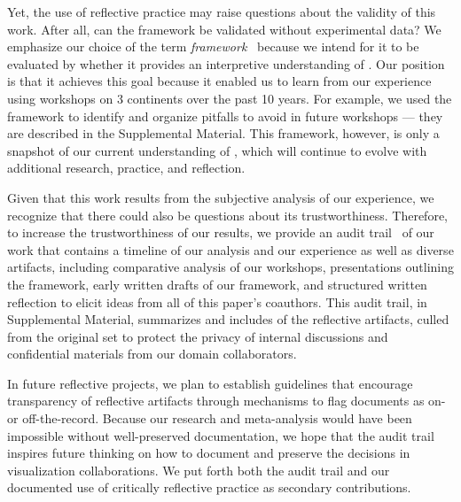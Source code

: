 Yet, the use of reflective practice may raise questions about the validity of this work. After all, can the framework be validated without experimental data? We emphasize our choice of the term {\it framework}~\cite{Jabareen2008} because we intend for it to be evaluated by whether it provides an interpretive understanding of \workshops. Our position is that it achieves this goal because it enabled us to learn from our experience using workshops on 3 continents over the past 10 years. For example, we used the framework to identify and organize \numberOfPitfalls pitfalls to avoid in future workshops --- they are described in the Supplemental Material. This framework, however, is only a snapshot of our current understanding of \workshops, which will continue to evolve with additional research, practice, and reflection.

Given that this work results from the subjective analysis of our experience, we recognize that there could also be questions about its trustworthiness. Therefore, to increase the trustworthiness of our results, we provide an audit trail~\cite{Carcary2009,Lincoln1985} of our work that contains a timeline of our analysis and our experience as well as diverse artifacts, including comparative analysis of our workshops, presentations outlining the framework, early written drafts of our framework, and structured written reflection to elicit ideas from all of this paper's coauthors. This audit trail, in Supplemental Material, summarizes and includes \numberOfAudits of the reflective artifacts, culled from the original set to protect the privacy of internal discussions and confidential materials from our domain collaborators. 

In future reflective projects, we plan to establish guidelines that encourage transparency of reflective artifacts through  mechanisms to flag documents as on- or off-the-record. Because our research and meta-analysis would have been impossible without well-preserved documentation, we hope that the audit trail inspires future thinking on how to document and preserve the decisions in visualization collaborations. We put forth both the audit trail and our documented use of critically reflective practice as secondary contributions.